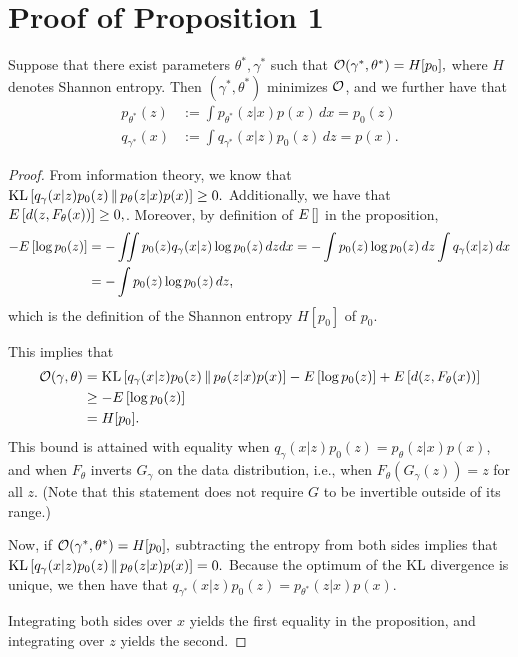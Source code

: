 \section{Proof of Proposition 1}
\begin{proposition}
Suppose that there exist parameters $\theta^*, \gamma^*$ such that 
$\mathcal{O}(\gamma^*, \theta^*)= H[p_0],$ where $H$ denotes Shannon entropy. Then $(\gamma^*, \theta^*)$ minimizes $\mathcal{O}$, and we further have that
\begin{align*}
 p_{\theta^*}(z) &:= \int p_{\theta^*}(z|x) p(x) \,dx = p_0(z) \\
q_{\gamma^*}(x) &:= \int q_{\gamma^*}(x|z) p_0(z) \,dz = p(x).
\end{align*}
\end{proposition}

\begin{proof}
From information theory, we know that
$ \mbox{KL}\left[ q_\gamma(x|z) p_0(z) \,\|\, p_\theta(z|x)p(x) \right] \geq 0.$
Additionally, we have that ${E}\left[ d(z, F_\theta(x)) \right] \geq 0,$. Moreover, by definition of ${E}\left[  \right]$ in the proposition,
\begin{align*}
-{E}\left[ \log p_0(z) \right]&= -\iint p_0(z) q_\gamma(x|z) \log p_0(z) \,dz dx = -\int p_0(z) \log p_0(z) \,dz  \int q_\gamma(x|z) \, dx \\
&= -\int p_0(z) \log p_0(z) \,dz,
\end{align*}
which is the definition of the Shannon entropy $H[p_0]$ of $p_0$.

This implies that
\begin{align*}
\mathcal{O}(\gamma, \theta) &=  \mbox{KL}\left[ q_\gamma(x|z) p_0(z) \,\|\, p_\theta(z|x)p(x) \right]
 - {E}\left[ \log p_0(z) \right]
+ {E}\left[ d(z, F_\theta(x)) \right] \\
&\geq - {E}\left[ \log p_0(z) \right] \\ &= H[p_0].
\end{align*}
This bound is attained with equality when $q_\gamma(x|z) p_0(z) = p_\theta(z|x)p(x)$,
and when $F_\theta$ inverts $G_\gamma$ on the data distribution, i.e.,
when  $F_\theta(G_\gamma(z)) = z$
for all $z$. (Note that this
statement does not require
$G$ to be invertible outside
of its range.)

Now, if $\mathcal{O}(\gamma^*, \theta^*) = H[p_0],$ subtracting the entropy
from both sides implies that
$\mbox{KL}\left[ q_\gamma(x|z) p_0(z) \,\|\, p_\theta(z|x)p(x) \right] = 0.$
Because the optimum of the KL divergence  is unique, we then have that  $q_{\gamma^*}(x|z) p_0(z) = p_{\theta^*}(z|x)p(x).$

Integrating both sides over $x$ yields the first equality in the proposition,
and integrating over $z$ yields the second.
\end{proof}

